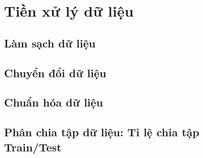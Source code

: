 \clearpage
\section{Tiền xử lý dữ liệu}
\subsection{Làm sạch dữ liệu}

\subsection{Chuyển đổi dữ liệu}

\subsection{Chuẩn hóa dữ liệu}

\subsection{Phân chia tập dữ liệu: Tỉ lệ chia tập Train/Test}